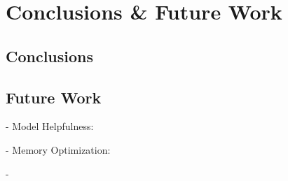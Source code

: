 



\chapter{Conclusions \& Future Work}  

\section{Conclusions}


\section{Future Work}

- Model Helpfulness:

- Memory Optimization:

- 
